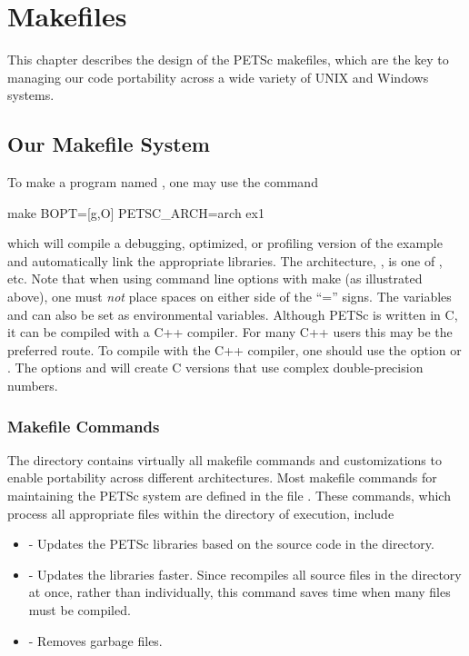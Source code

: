 {{{%
\chapter{Makefiles}
\label{ch_makefiles}

This chapter describes the design of the PETSc makefiles, which are the
key to managing our code portability across a wide variety of UNIX and Windows systems.

\section{Our Makefile System}

To make a program named , one may use the command
\begin{tabbing}
   make BOPT=[g,O] PETSC\_ARCH=arch  ex1
\end{tabbing}
which will compile a debugging, optimized, or profiling version
of the example and automatically link the appropriate libraries.  The
architecture, , is one of , etc. Note
that when using command line options with make (as illustrated above),
one must {\em not} place spaces on either side of the ``='' signs.
The variables  and 
 can also be set as environmental
variables.  Although PETSc is written in C, it can be compiled with a 
C++ compiler.  For many C++ users this may be the preferred route. To compile
with the C++ compiler, one should use the option  or 
.  
The options  and 
will create C versions that use complex double-precision numbers. 

\subsection{Makefile Commands} \label{sec_common}

The directory  contains virtually all
makefile commands and customizations to enable portability across
different architectures.  Most makefile commands for maintaining the
PETSc system are defined in the file .  
These commands, which process all appropriate files within the
directory of execution, include
\begin{itemize}
\item {} - Updates the PETSc libraries based on the source code
      in the directory.
\item {} - Updates the libraries faster.  Since
       recompiles all source files in the directory at once,
      rather than individually, this command saves time when many files
      must be compiled.
\item {} - Removes garbage files.
\end{itemize}

}}}
